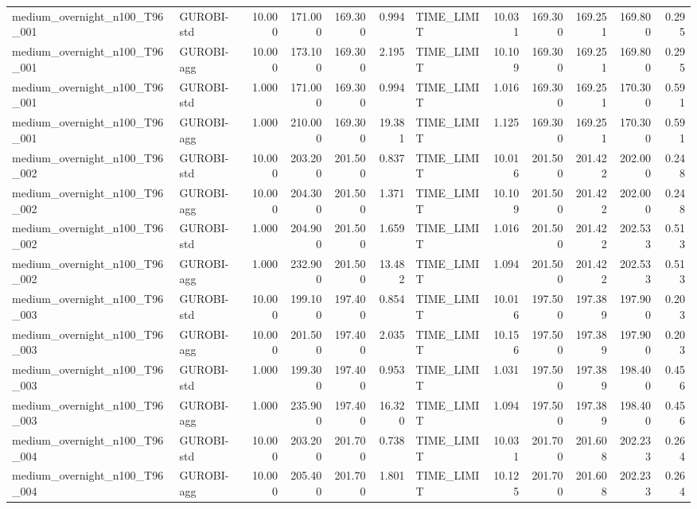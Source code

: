 \begin{table}[htbp]
\begin{tabular}{llrrrrlrrrrr}
medium\_overnight\_n100\_T96\_001 & GUROBI-std & 10.000 & 171.000 & 169.300 & 0.994 & TIME\_LIMIT & 10.031 & 169.300 & 169.251 & 169.800 & 0.295 \\
medium\_overnight\_n100\_T96\_001 & GUROBI-agg & 10.000 & 173.100 & 169.300 & 2.195 & TIME\_LIMIT & 10.109 & 169.300 & 169.251 & 169.800 & 0.295 \\
medium\_overnight\_n100\_T96\_001 & GUROBI-std & 1.000 & 171.000 & 169.300 & 0.994 & TIME\_LIMIT & 1.016 & 169.300 & 169.251 & 170.300 & 0.591 \\
medium\_overnight\_n100\_T96\_001 & GUROBI-agg & 1.000 & 210.000 & 169.300 & 19.381 & TIME\_LIMIT & 1.125 & 169.300 & 169.251 & 170.300 & 0.591 \\
medium\_overnight\_n100\_T96\_002 & GUROBI-std & 10.000 & 203.200 & 201.500 & 0.837 & TIME\_LIMIT & 10.016 & 201.500 & 201.422 & 202.000 & 0.248 \\
medium\_overnight\_n100\_T96\_002 & GUROBI-agg & 10.000 & 204.300 & 201.500 & 1.371 & TIME\_LIMIT & 10.109 & 201.500 & 201.422 & 202.000 & 0.248 \\
medium\_overnight\_n100\_T96\_002 & GUROBI-std & 1.000 & 204.900 & 201.500 & 1.659 & TIME\_LIMIT & 1.016 & 201.500 & 201.422 & 202.533 & 0.513 \\
medium\_overnight\_n100\_T96\_002 & GUROBI-agg & 1.000 & 232.900 & 201.500 & 13.482 & TIME\_LIMIT & 1.094 & 201.500 & 201.422 & 202.533 & 0.513 \\
medium\_overnight\_n100\_T96\_003 & GUROBI-std & 10.000 & 199.100 & 197.400 & 0.854 & TIME\_LIMIT & 10.016 & 197.500 & 197.389 & 197.900 & 0.203 \\
medium\_overnight\_n100\_T96\_003 & GUROBI-agg & 10.000 & 201.500 & 197.400 & 2.035 & TIME\_LIMIT & 10.156 & 197.500 & 197.389 & 197.900 & 0.203 \\
medium\_overnight\_n100\_T96\_003 & GUROBI-std & 1.000 & 199.300 & 197.400 & 0.953 & TIME\_LIMIT & 1.031 & 197.500 & 197.389 & 198.400 & 0.456 \\
medium\_overnight\_n100\_T96\_003 & GUROBI-agg & 1.000 & 235.900 & 197.400 & 16.320 & TIME\_LIMIT & 1.094 & 197.500 & 197.389 & 198.400 & 0.456 \\
medium\_overnight\_n100\_T96\_004 & GUROBI-std & 10.000 & 203.200 & 201.700 & 0.738 & TIME\_LIMIT & 10.031 & 201.700 & 201.608 & 202.233 & 0.264 \\
medium\_overnight\_n100\_T96\_004 & GUROBI-agg & 10.000 & 205.400 & 201.700 & 1.801 & TIME\_LIMIT & 10.125 & 201.700 & 201.608 & 202.233 & 0.264 \\

\end{tabular}
\end{table}
